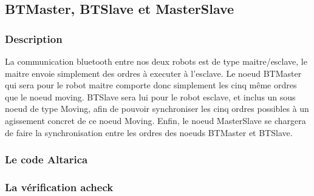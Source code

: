   \subsection{BTMaster, BTSlave et MasterSlave}
  
   \subsubsection{Description}
   La communication bluetooth entre nos deux robots est de type
   maitre/esclave, le maitre envoie simplement des ordres à executer à
   l'esclave. Le noeud BTMaster qui sera pour le robot maitre comporte
   donc simplement les cinq même ordres que le noeud moving. BTSlave
   sera lui pour le robot esclave, et inclus un sous noeud de type
   Moving, afin de pouvoir synchroniser les cinq ordres possibles à un
   agissement concret de ce noeud Moving. Enfin, le noeud MasterSlave se
   chargera de faire la synchronisation entre les ordres des noeuds
   BTMaster et BTSlave.


  \subsubsection{Le code Altarica}
  

  

  

\subsubsection{La vérification acheck}
   
  

